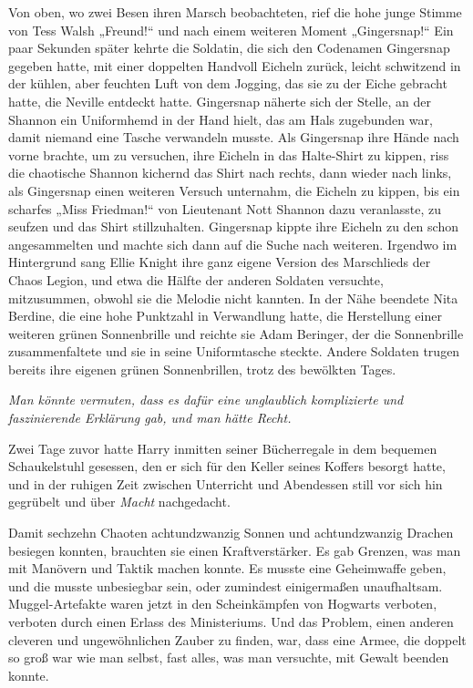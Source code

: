 {Von oben, wo zwei Besen ihren Marsch beobachteten, rief die hohe junge Stimme von Tess Walsh „Freund!“ und nach einem weiteren Moment „Gingersnap!“ Ein paar Sekunden später kehrte die Soldatin, die sich den Codenamen Gingersnap gegeben hatte, mit einer doppelten Handvoll Eicheln zurück, leicht schwitzend in der kühlen, aber feuchten Luft von dem Jogging, das sie zu der Eiche gebracht hatte, die Neville entdeckt hatte. Gingersnap näherte sich der Stelle, an der Shannon ein Uniformhemd in der Hand hielt, das am Hals zugebunden war, damit niemand eine Tasche verwandeln musste. Als Gingersnap ihre Hände nach vorne brachte, um zu versuchen, ihre Eicheln in das Halte-Shirt zu kippen, riss die chaotische Shannon kichernd das Shirt nach rechts, dann wieder nach links, als Gingersnap einen weiteren Versuch unternahm, die Eicheln zu kippen, bis ein scharfes „Miss Friedman!“ von Lieutenant Nott Shannon dazu veranlasste, zu seufzen und das Shirt stillzuhalten. Gingersnap kippte ihre Eicheln zu den schon angesammelten und machte sich dann auf die Suche nach weiteren. Irgendwo im Hintergrund sang Ellie Knight ihre ganz eigene Version des Marschlieds der Chaos Legion, und etwa die Hälfte der anderen Soldaten versuchte, mitzusummen, obwohl sie die Melodie nicht kannten. In der Nähe beendete Nita Berdine, die eine hohe Punktzahl in Verwandlung hatte, die Herstellung einer weiteren grünen Sonnenbrille und reichte sie Adam Beringer, der die Sonnenbrille zusammenfaltete und sie in seine Uniformtasche steckte. Andere Soldaten trugen bereits ihre eigenen grünen Sonnenbrillen, trotz des bewölkten Tages.

\emph{Man könnte vermuten, dass es dafür eine unglaublich komplizierte und faszinierende Erklärung gab, und man hätte Recht.}

Zwei Tage zuvor hatte Harry inmitten seiner Bücherregale in dem bequemen Schaukelstuhl gesessen, den er sich für den Keller seines Koffers besorgt hatte, und in der ruhigen Zeit zwischen Unterricht und Abendessen still vor sich hin gegrübelt und über \emph{Macht} nachgedacht.

Damit sechzehn Chaoten achtundzwanzig Sonnen und achtundzwanzig Drachen besiegen konnten, brauchten sie einen Kraftverstärker. Es gab Grenzen, was man mit Manövern und Taktik machen konnte. Es musste eine Geheimwaffe geben, und die musste unbesiegbar sein, oder zumindest einigermaßen unaufhaltsam.\\ Muggel-Artefakte waren jetzt in den Scheinkämpfen von Hogwarts verboten, verboten durch einen Erlass des Ministeriums. Und das Problem, einen anderen cleveren und ungewöhnlichen Zauber zu finden, war, dass eine Armee, die doppelt so groß war wie man selbst, fast alles, was man versuchte, mit Gewalt beenden konnte.

}
